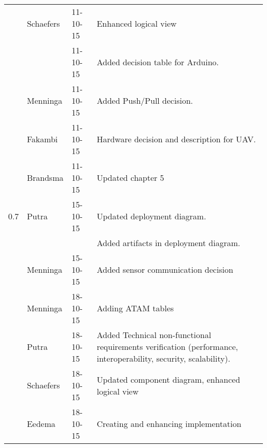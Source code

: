 \begin{longtable}{L{} L{} L{} L{}}
	                 & Schaefers             & 11-10-15      & Enhanced logical view                                                                                                                                                                                                      \\
	                 &                       & 11-10-15      & Added decision table for Arduino.                                                                                                                                                                                          \\
	                 & Menninga              & 11-10-15      & Added Push/Pull decision.                                                                                                                                                                                                  \\
	                 & Fakambi               & 11-10-15      & Hardware decision and description for UAV.                                                                                                                                                                                 \\
	                 & Brandsma              & 11-10-15      & Updated chapter 5                                                                                                                                                                                                          \\
	\midrule
			
	0.7              & Putra                 & 15-10-15      & Updated deployment diagram. \\
	                 &                       &               & Added artifacts in deployment diagram. \\
                     & Menninga				 & 15-10-15      & Added sensor communication decision \\
	                 & Menninga				 & 18-10-15      & Adding ATAM tables \\
	                 & Putra                 & 18-10-15      & Added Technical non-functional requirements verification (performance, interoperability, security, scalability). \\
	                 & Schaefers			& 18-10-15      & Updated component diagram, enhanced logical view \\
	                 & Eedema				& 18-10-15		& Creating and enhancing implementation \\
	\bottomrule
\end{longtable}